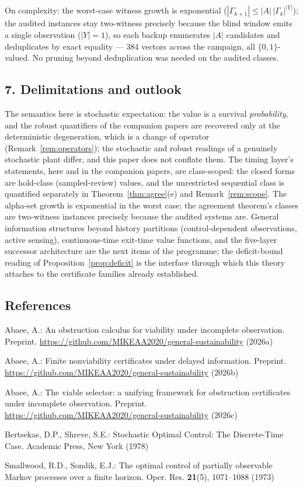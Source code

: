 \documentclass[10pt,twocolumn]{article}
\theoremstyle{definition}
\begin{document}
On complexity: the worst-case witness growth is exponential
(\(|\Gamma_{k+1}| \le |A|\,|\Gamma_{k}|^{|Y|}\)); the audited instances
stay two-witness precisely because the blind window emits a single
observation (\(|Y| = 1\)), so each backup enumerates \(|A|\) candidates
and deduplicates by exact equality — 384 vectors across the campaign,
all \(\{0,1\}\)-valued. No pruning beyond deduplication was needed on the
audited classes.

\subsection{7. Delimitations and outlook}\label{scope}

The semantics here is stochastic expectation: the value is a survival
\emph{probability}, and the robust quantifiers of the companion papers
are recovered only at the deterministic degeneration, which is a change
of operator (Remark~\ref{rem:operators}); the stochastic and robust
readings of a genuinely stochastic plant differ, and this paper does not
conflate them. The timing layer's statements, here and in the companion
papers, are class-scoped: the closed forms are hold-class
(sampled-review) values, and the unrestricted sequential class is
quantified separately in Theorem~\ref{thm:agree}(e) and
Remark~\ref{rem:scope}. The alpha-set growth is exponential in the worst
case; the agreement theorem's classes are two-witness instances precisely
because the audited systems are. General information structures beyond
history partitions (control-dependent observations, active sensing),
continuous-time exit-time value functions, and the five-layer successor
architecture are the next items of the programme; the deficit-bound
reading of Proposition~\ref{prop:deficit} is the interface through which
this theory attaches to the certificate families already established.

\subsection{References}\label{references}
{\footnotesize

Abaee, A.: An obstruction calculus for viability under incomplete
observation. Preprint.
\url{https://github.com/MIKEAA2020/general-sustainability} (2026a)

Abaee, A.: Finite nonviability certificates under delayed information.
Preprint. \url{https://github.com/MIKEAA2020/general-sustainability} (2026b)

Abaee, A.: The viable selector: a unifying framework for obstruction
certificates under incomplete observation. Preprint.
\url{https://github.com/MIKEAA2020/general-sustainability} (2026c)

Bertsekas, D.P., Shreve, S.E.: Stochastic Optimal Control: The Discrete-Time
Case. Academic Press, New York (1978)

Smallwood, R.D., Sondik, E.J.: The optimal control of partially observable
Markov processes over a finite horizon. Oper. Res. \textbf{21}(5),
1071--1088 (1973)

}
\end{document}
